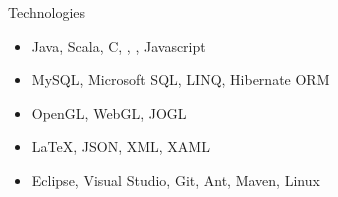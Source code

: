 \cvitem
    {Technologies}
    {\begin{itemize}
        \item Java, Scala, C, \cpp, \csharp, Javascript
        \item MySQL, Microsoft SQL, LINQ, Hibernate ORM
        \item OpenGL, WebGL, JOGL
        \item \LaTeX, JSON, XML, XAML
        \item Eclipse, Visual Studio, Git, Ant, Maven, Linux
    \end{itemize}}
    \vspace*{-\baselineskip}